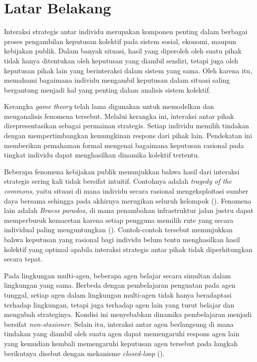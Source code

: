 \section{Latar Belakang}

Interaksi strategis antar individu merupakan komponen penting dalam berbagai proses pengambilan keputusan kolektif pada sistem sosial, ekonomi, maupun kebijakan publik. Dalam banyak situasi, hasil yang diperoleh oleh suatu pihak tidak hanya ditentukan oleh keputusan yang diambil sendiri, tetapi juga oleh keputusan pihak lain yang berinteraksi dalam sistem yang sama. Oleh karena itu, memahami bagaimana individu mengambil keputusan dalam situasi saling bergantung menjadi hal yang penting dalam analisis sistem kolektif.

Kerangka \textit{game theory} telah lama digunakan untuk memodelkan dan menganalisis fenomena tersebut. Melalui kerangka ini, interaksi antar pihak direpresentasikan sebagai permainan strategis. Setiap individu memilih tindakan dengan mempertimbangkan kemungkinan respons dari pihak lain. Pendekatan ini memberikan pemahaman formal mengenai bagaimana keputusan rasional pada tingkat individu dapat menghasilkan dinamika kolektif tertentu.

Beberapa fenomena kebijakan publik menunjukkan bahwa hasil dari interaksi strategis sering kali tidak bersifat intuitif. Contohnya adalah \textit{tragedy of the commons}, yaitu situasi di mana individu secara rasional mengeksploitasi sumber daya bersama sehingga pada akhirnya merugikan seluruh kelompok (\cite{hardin_tragedy_1968}). Fenomena lain adalah \textit{Braess paradox}, di mana penambahan infrastruktur jalan justru dapat memperburuk kemacetan karena setiap pengguna memilih rute yang secara individual paling menguntungkan (\cite{roughgarden_selfish_2005}). Contoh-contoh tersebut menunjukkan bahwa keputusan yang rasional bagi individu belum tentu menghasilkan hasil kolektif yang optimal apabila interaksi strategis antar pihak tidak diperhitungkan secara tepat.

Pada lingkungan multi-agen, beberapa agen belajar secara simultan dalam lingkungan yang sama. Berbeda dengan pembelajaran penguatan pada agen tunggal, setiap agen dalam lingkungan multi-agen tidak hanya beradaptasi terhadap lingkungan, tetapi juga terhadap agen lain yang turut belajar dan mengubah strateginya. Kondisi ini menyebabkan dinamika pembelajaran menjadi bersifat \textit{non-stasioner}. Selain itu, interaksi antar agen berlangsung di mana tindakan yang diambil oleh suatu agen dapat memengaruhi respons agen lain yang kemudian kembali memengaruhi keputusan agen tersebut pada langkah berikutnya disebut dengan mekanisme \textit{closed-loop} (\cite{hernandez-leal_survey_2019}).

